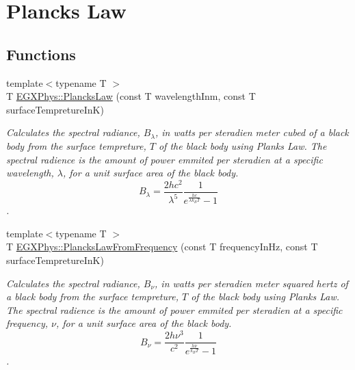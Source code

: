 \hypertarget{group___e_g_x_phys-_electrodynamics-_black_body-_plancks_law}{}\section{Planck\textquotesingle{}s Law}
\label{group___e_g_x_phys-_electrodynamics-_black_body-_plancks_law}
\subsection*{Functions}
\begin{DoxyCompactItemize}
\item 
{\footnotesize template$<$typename T $>$ }\\T \mbox{\hyperlink{group___e_g_x_phys-_electrodynamics-_black_body-_plancks_law_ga44d8dc3e072ffc7d860cd8f07463f091}{E\+G\+X\+Phys\+::\+Plancks\+Law}} (const T wavelength\+Inm, const T surface\+Tempreture\+InK)
\begin{DoxyCompactList}\small\item\em Calculates the spectral radiance, $B_{\lambda}$, in watts per steradien meter cubed of a black body from the surface tempreture, $T$ of the black body using Plank\textquotesingle{}s Law. The spectral radience is the amount of power emmited per steradien at a specific wavelength, $\lambda$, for a unit surface area of the black body. \[ B_{\lambda} = \dfrac{2 h c^2}{\lambda^5} \dfrac{1}{e^{\frac{hc}{\lambda k_B T}} - 1} \]. \end{DoxyCompactList}\item 
{\footnotesize template$<$typename T $>$ }\\T \mbox{\hyperlink{group___e_g_x_phys-_electrodynamics-_black_body-_plancks_law_ga68aae82f8a086831358c4a61c8c80ba4}{E\+G\+X\+Phys\+::\+Plancks\+Law\+From\+Frequency}} (const T frequency\+In\+Hz, const T surface\+Tempreture\+InK)
\begin{DoxyCompactList}\small\item\em Calculates the spectral radiance, $B_{\nu}$, in watts per steradien meter squared hertz of a black body from the surface tempreture, $T$ of the black body using Plank\textquotesingle{}s Law. The spectral radience is the amount of power emmited per steradien at a specific frequency, $\nu$, for a unit surface area of the black body. \[ B_{\nu} = \dfrac{2 h \nu^3}{c^2} \dfrac{1}{e^{\frac{h\nu}{k_B T}} - 1} \]. \end{DoxyCompactList}\item 

\end{DoxyCompactItemize}
